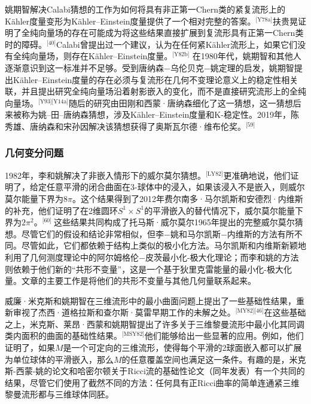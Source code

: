 姚期智解决Calabi猜想的工作为如何将具有非正第一Chern类的紧复流形上的Kähler度量变形为Kähler–Einstein度量提供了一个相对完整的答案。\(^\text{[Y78a]}\)扶贵晃证明了全纯向量场的存在可能成为将这些结果直接扩展到复流形具有正第一Chern类时的障碍。\(^\text{[40]}\)Calabi曾提出过一个建议，认为在任何紧Kähler流形上，如果它们没有全纯向量场，则存在Kähler–Einstein度量。\(^\text{[Y82b]}\) 在1980年代，姚期智和其他人逐渐意识到这一标准并不足够。受到唐纳森−乌伦贝克−姚定理的启发，姚期智提出Kähler–Einstein度量的存在必须与复流形在几何不变理论意义上的稳定性相关联，并且提出研究全纯向量场沿着射影嵌入的变化，而不是直接研究流形上的全纯向量场。\(^\text{[Y93][Y14a]}\)随后的研究由田刚和西蒙·唐纳森细化了这一猜想，这一猜想后来被称为姚–田–唐纳森猜想，涉及Kähler–Einstein度量和K-稳定性。2019年，陈秀雄、唐纳森和宋孙因解决该猜想获得了奥斯瓦尔德·维布伦奖。\(^\text{[59]}\)
\subsubsection{几何变分问题}  
1982年，李和姚解决了非嵌入情形下的威尔莫尔猜想。\(^\text{[LY82]}\)更准确地说，他们证明了，给定任意平滑的闭合曲面在3-球体中的浸入，如果该浸入不是嵌入，则威尔莫尔能量下界为\(8\pi\)。这个结果得到了2012年费尔南多·马尔凯斯和安德烈·内维斯的补充，他们证明了在2维圆环\(S^1 \times S^1\)的平滑嵌入的替代情况下，威尔莫尔能量下界为\(2\pi^2\)。\(^\text{[60] }\)这些结果共同构成了托马斯·威尔莫尔1965年提出的完整威尔莫尔猜想。尽管它们的假设和结论非常相似，但李−姚和马尔凯斯−内维斯的方法有所不同。尽管如此，它们都依赖于结构上类似的极小化方法。马尔凯斯和内维斯新颖地利用了几何测度理论中的阿尔姆格伦−皮茨最小化-极大化理论；而李和姚的方法则依赖于他们新的“共形不变量”，这是一个基于狄里克雷能量的最小化-极大化量。文章的主要工作是将他们的共形不变量与其他几何量联系起来。

威廉·米克斯和姚期智在三维流形中的最小曲面问题上提出了一些基础性结果，重新审视了杰西·道格拉斯和查尔斯·莫雷早期工作的未解之处。\(^\text{[MY82][46]}\)在这些基础之上，米克斯、莱昂·西蒙和姚期智提出了许多关于三维黎曼流形中最小化其同调类内面积的曲面的基础性结果。\(^\text{[MSY82]}\)他们能够给出一些显著的应用。例如，他们证明了，如果\(M\)是一个可定向的三维流形，使得每个平滑的2球面嵌入都可以扩展为单位球体的平滑嵌入，那么\(M\)的任意覆盖空间也满足这一条件。有趣的是，米克斯-西蒙-姚的论文和哈密尔顿关于Ricci流的基础性论文（同年发表）有一个共同的结果，尽管它们使用了截然不同的方法：任何具有正Ricci曲率的简单连通紧三维黎曼流形都与三维球体同胚。
